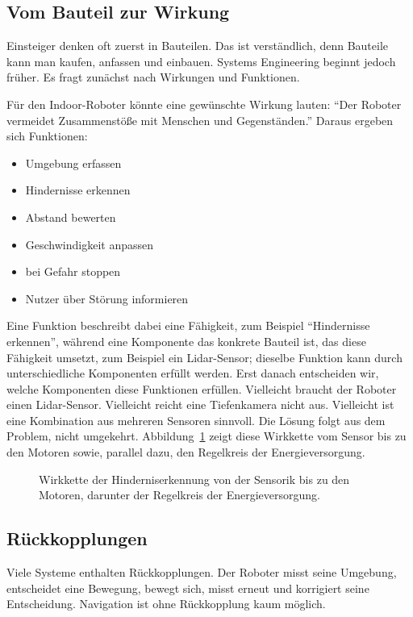 \subsection{Vom Bauteil zur Wirkung}
Einsteiger denken oft zuerst in Bauteilen. Das ist verständlich, denn Bauteile kann man kaufen, anfassen und einbauen. Systems Engineering beginnt jedoch früher. Es fragt zunächst nach Wirkungen und Funktionen.

Für den Indoor-Roboter könnte eine gewünschte Wirkung lauten: \enquote{Der Roboter vermeidet Zusammenstöße mit Menschen und Gegenständen.} Daraus ergeben sich Funktionen:

\begin{itemize}
    \item Umgebung erfassen
    \item Hindernisse erkennen
    \item Abstand bewerten
    \item Geschwindigkeit anpassen
    \item bei Gefahr stoppen
    \item Nutzer über Störung informieren
\end{itemize}

Eine Funktion beschreibt dabei eine Fähigkeit, zum Beispiel \enquote{Hindernisse erkennen}, während eine Komponente das konkrete Bauteil ist, das diese Fähigkeit umsetzt, zum Beispiel ein Lidar-Sensor; dieselbe Funktion kann durch unterschiedliche Komponenten erfüllt werden. Erst danach entscheiden wir, welche Komponenten diese Funktionen erfüllen. Vielleicht braucht der Roboter einen Lidar-Sensor. Vielleicht reicht eine Tiefenkamera nicht aus. Vielleicht ist eine Kombination aus mehreren Sensoren sinnvoll. Die Lösung folgt aus dem Problem, nicht umgekehrt. Abbildung~\ref{fig:kap01-wirkkette} zeigt diese Wirkkette vom Sensor bis zu den Motoren sowie, parallel dazu, den Regelkreis der Energieversorgung.

\begin{figure}[H]
  \centering
  \caption{Wirkkette der Hinderniserkennung von der Sensorik bis zu den Motoren, darunter der Regelkreis der Energieversorgung.}
  \label{fig:kap01-wirkkette}
\end{figure}

\subsection{Rückkopplungen}
Viele Systeme enthalten Rückkopplungen. Der Roboter misst seine Umgebung, entscheidet eine Bewegung, bewegt sich, misst erneut und korrigiert seine Entscheidung. Navigation ist ohne Rückkopplung kaum möglich.


